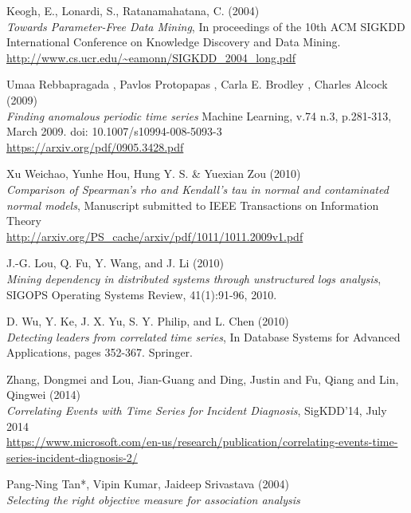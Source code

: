 \documentclass[12pt,a4paper]{article}
\begin{document}
\begin{thebibliography}{9}
Keogh, E., Lonardi, S., Ratanamahatana, C. (2004)\\
\textit{Towards Parameter-Free Data Mining},
In proceedings of the 10th ACM SIGKDD International Conference on Knowledge Discovery and Data Mining.\\
\url{http://www.cs.ucr.edu/~eamonn/SIGKDD_2004_long.pdf}

Umaa Rebbapragada , Pavlos Protopapas , Carla E. Brodley , Charles Alcock (2009)\\
\textit{Finding anomalous periodic time series}
Machine Learning, v.74 n.3, p.281-313, March 2009. doi: 10.1007/s10994-008-5093-3\\
\url{https://arxiv.org/pdf/0905.3428.pdf}

Xu Weichao, Yunhe Hou, Hung Y. S. \& Yuexian Zou (2010)\\
\textit{Comparison of Spearman's rho and Kendall's tau in normal and contaminated normal models}, Manuscript submitted to IEEE Transactions on Information Theory\\
\url{http://arxiv.org/PS_cache/arxiv/pdf/1011/1011.2009v1.pdf}

 J.-G. Lou, Q. Fu, Y. Wang, and J. Li (2010)\\
\textit{Mining dependency in distributed systems through unstructured logs analysis}, SIGOPS Operating Systems Review, 41(1):91-96, 2010.

D. Wu, Y. Ke, J. X. Yu, S. Y. Philip, and L. Chen (2010)\\
\textit{Detecting leaders from correlated time series}, In Database Systems for Advanced Applications, pages 352-367. Springer.

Zhang, Dongmei and Lou, Jian-Guang and Ding, Justin and Fu, Qiang and Lin, Qingwei (2014)\\
\textit{Correlating Events with Time Series for Incident Diagnosis},
SigKDD'14, July 2014\\
\url{https://www.microsoft.com/en-us/research/publication/correlating-events-time-series-incident-diagnosis-2/}

Pang-Ning Tan*, Vipin Kumar, Jaideep Srivastava (2004)\\
\textit{Selecting the right objective measure for association analysis}



\end{thebibliography}
\end{document}
